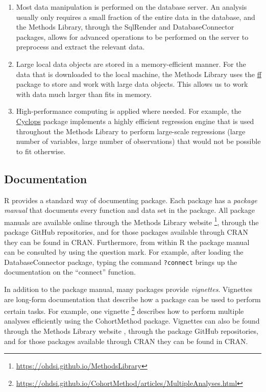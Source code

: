 \documentclass[11pt]{book}
\providecommand{\tightlist}{%
  \setlength{\itemsep}{0pt}\setlength{\parskip}{0pt}}
\let\rmarkdownfootnote\footnote%
\def\footnote{\protect\rmarkdownfootnote}
\theoremstyle{definition}
\theoremstyle{definition}
\theoremstyle{definition}
\theoremstyle{remark}
\begin{document}
\begin{enumerate}
\def\labelenumi{\arabic{enumi}.}
\tightlist
\item
  Most data manipulation is performed on the database server. An analysis usually only requires a small fraction of the entire data in the database, and the Methods Library, through the SqlRender and DatabaseConnector packages, allows for advanced operations to be performed on the server to preprocess and extract the relevant data.
\item
  Large local data objects are stored in a memory-efficient manner. For the data that is downloaded to the local machine, the Methods Library uses the \href{https://cran.r-project.org/web/packages/ff}{ff} package to store and work with large data objects. This allows us to work with data much larger than fits in memory.
\item
  High-performance computing is applied where needed. For example, the \href{https://ohdsi.github.io/Cyclops/}{Cyclops} package implements a highly efficient regression engine that is used throughout the Methods Library to perform large-scale regressions (large number of variables, large number of observations) that would not be possible to fit otherwise.
\end{enumerate}

\hypertarget{documentation-1}{%
\subsection{Documentation}\label{documentation-1}}

R provides a standard way of documenting package. Each package has a \emph{package manual} that documents every function and data set in the package. All package manuals are available online through the Methods Library website \footnote{\url{https://ohdsi.github.io/MethodsLibrary}}, through the package GitHub repositories, and for those packages available through CRAN they can be found in CRAN. Furthermore, from within R the package manual can be consulted by using the question mark. For example, after loading the DatabaseConnector package, typing the command \texttt{?connect} brings up the documentation on the ``connect'' function.

In addition to the package manual, many packages provide \emph{vignettes}. Vignettes are long-form documentation that describe how a package can be used to perform certain tasks. For example, one vignette \footnote{\url{https://ohdsi.github.io/CohortMethod/articles/MultipleAnalyses.html}} describes how to perform multiple analyses efficiently using the CohortMethod package. Vignettes can also be found through the Methods Library website , through the package GitHub repositories, and for those packages available through CRAN they can be found in CRAN.
\end{document}
